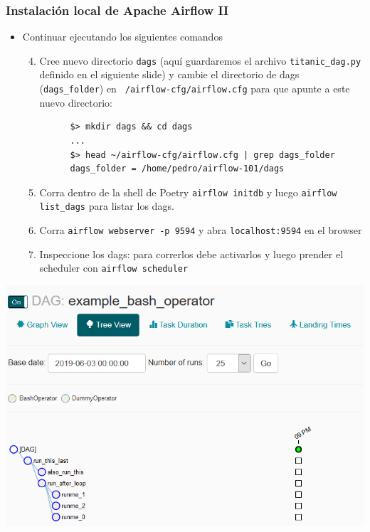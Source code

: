 \documentclass[leqno, 10pt, envcountsect]{beamer}
\numberwithin{equation}{section}
\theoremstyle{definition}
\theoremstyle{example}
\numberwithin{figure}{section}
\numberwithin{table}{section}
\let\olditem\item
\renewcommand{\item}{%
\olditem\vspace{1pt}}
\begin{document}
\begin{frame}[fragile=singleslide]
  \frametitle{Instalación local de Apache Airflow II}
  \begin{itemize}
    \item Continuar ejecutando los siguientes comandos
    \begin{enumerate}
      \setcounter{enumi}{3}
      \item Cree
        nuevo directorio \texttt{dags} (aquí guardaremos el archivo
        \texttt{titanic_dag.py} definido en el siguiente slide) y cambie el directorio de dags
        (\texttt{dags_folder}) en
        \texttt{~/airflow-cfg/airflow.cfg} para que apunte a este nuevo
        directorio:
      \begin{verbatim}
      $> mkdir dags && cd dags
      ...
      $> head ~/airflow-cfg/airflow.cfg | grep dags_folder
      dags_folder = /home/pedro/airflow-101/dags
      \end{verbatim}
    \item Corra dentro de la shell de Poetry \texttt{airflow initdb} y luego \texttt{airflow list_dags}
      para listar los dags.
    \item Corra \texttt{airflow webserver -p 9594} y abra \texttt{localhost:9594} en
      el browser
    \item Inspeccione los dags: para correrlos debe activarlos y luego
      prender el scheduler con \texttt{airflow scheduler}
    \end{enumerate}
  \end{itemize}
  \begin{center}
    \includegraphics[scale=0.2]{example_bash_operator.png}
  \end{center}
\end{frame}
\end{document}
